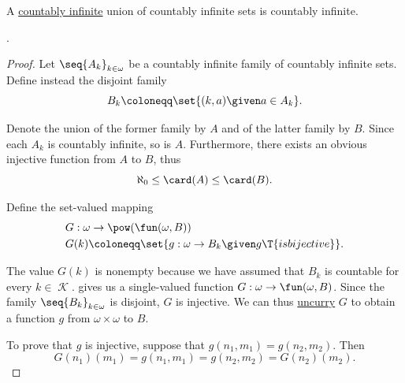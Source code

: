 \begin{proposition}\label{thm:countably_infinite_union_of_countably_infinite_sets}
  A \hyperref[def:aleph_zero_related_cardinalities]{countably infinite} union of countably infinite sets is countably infinite.
\end{proposition}
\begin{comments}
  \item {}.
\end{comments}
\begin{proof}
  Let \( \seq{ A_k }_{k \in \omega} \) be a countably infinite family of countably infinite sets. Define instead the disjoint family
  \begin{equation*}
    B_k \coloneqq \set{ (k, a) \given a \in A_k }.
  \end{equation*}

  Denote the union of the former family by \( A \) and of the latter family by \( B \). Since each \( A_k \) is countably infinite, so is \( A \). Furthermore, there exists an obvious injective function from \( A \) to \( B \), thus
  \begin{equation}\label{eq:thm:countably_infinite_union_of_countably_infinite_sets/union_card_inequality}
    \aleph_0 \leq \card(A) \leq \card(B).
  \end{equation}

  Define the set-valued mapping
  \begin{equation*}
    \begin{aligned}
      &G: \omega \to \pow(\fun(\omega, B)) \\
      &G(k) \coloneqq \set{ g: \omega \to B_k \given g \T{is bijective} }.
    \end{aligned}
  \end{equation*}

  The value \( G(k) \) is nonempty because we have assumed that \( B_k \) is countable for every \( k \in \mscrK \).  gives us a single-valued function \( G: \omega \to \fun(\omega, B) \). Since the family \( \seq{ B_k }_{k \in \omega} \) is disjoint, \( G \) is injective. We can thus \hyperref[con:currying]{uncurry} \( G \) to obtain a function \( g \) from \( \omega \times \omega \) to \( B \).

  To prove that \( g \) is injective, suppose that \( g(n_1, m_1) = g(n_2, m_2) \). Then
  \begin{equation*}
    G(n_1)(m_1) = g(n_1, m_1) = g(n_2, m_2) = G(n_2)(m_2).
  \end{equation*}


\end{proof}
